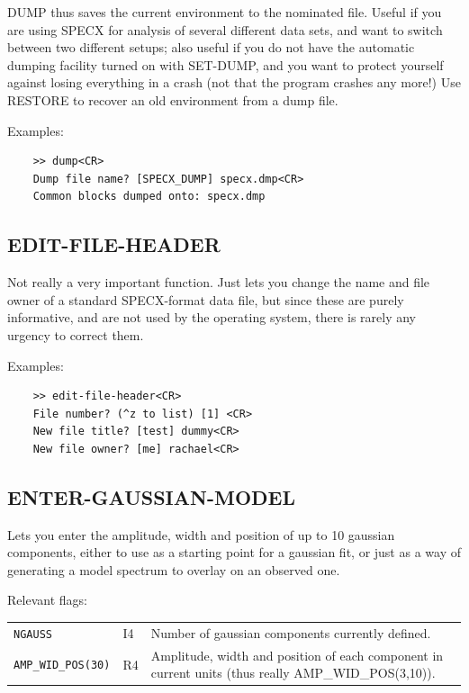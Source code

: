 \documentclass[11pt,twoside]{report}
\begin{document}
DUMP thus saves the current environment  to the
nominated file. Useful if you are using SPECX for analysis of several different
data sets, and want to switch between two different setups; also useful if you
do not have the automatic dumping facility turned on with SET-DUMP, and you
want to protect yourself against losing everything in a crash (not that the
program crashes any more!) Use RESTORE to recover an old environment from a
dump file.

Examples:
\begin{verbatim}
    >> dump<CR>
    Dump file name? [SPECX_DUMP] specx.dmp<CR>
    Common blocks dumped onto: specx.dmp
\end{verbatim}

\subsection{EDIT-FILE-HEADER} 

Not really a very important function. Just lets you change the name and
file owner of a standard SPECX-format data file, 
but since these are purely informative, and are not
used by the operating system, there is rarely any urgency to correct them.

Examples:
\begin{verbatim}
    >> edit-file-header<CR>
    File number? (^z to list) [1] <CR>
    New file title? [test] dummy<CR>
    New file owner? [me] rachael<CR>
\end{verbatim}

\subsection{ENTER-GAUSSIAN-MODEL} 

Lets you enter the amplitude, width and position of up to 10 gaussian
components, either to use as a starting point for a gaussian fit, or just as
a way of generating a model spectrum to overlay on an observed one.

Relevant flags:\\
\begin{tabular}{lll}
  \verb+NGAUSS+         &I4 & Number of gaussian components currently defined.\\
  \verb+AMP_WID_POS(30)+&R4 & \parbox[t]{4in}
                              {Amplitude, width and position of each
                               component in current units (thus really
                               AMP\_WID\_POS(3,10)).}
\end{tabular}
\end{document}

